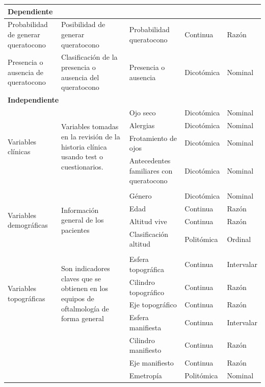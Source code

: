 \begin{landscape}
\begin{longtable}{p{4cm}p{6.5cm}p{5cm}p{3cm}p{2.5cm}}
    \multicolumn{5}{l}{\textbf{Dependiente}} \\
    \hline
    Probabilidad de generar queratocono & Posibilidad de generar queratocono & Probabilidad queratocono & Continua & Razón \\
    \hline
    Presencia o ausencia de queratocono & Clasificación de la presencia o ausencia del queratocono & Presencia o ausencia & Dicotómica & Nominal \\
    \hline
    \multicolumn{5}{l}{\textbf{Independiente}} \\
    \hline
    \multirow{4}{*}{Variables clínicas} & \multirow{4}{6.5cm}{Variables tomadas en la revisión de la historia clínica usando test o cuestionarios.} & Ojo seco & Dicotómica & Nominal \\
    \cline{3-5}
    & & Alergias & Dicotómica & Nominal \\
    \cline{3-5}
    & & Frotamiento de ojos & Dicotómica & Nominal \\
    \cline{3-5}
    & & Antecedentes familiares con queratocono & Dicotómica & Nominal \\
    \hline \\
    \multirow{4}{*}{Variables demográficas} & \multirow{4}{6.5cm}{Información general de los pacientes} & Género & Dicotómica & Nominal \\
    \cline{3-5}
    & & Edad & Continua & Razón \\
    \cline{3-5}
    & & Altitud vive & Continua & Razón \\
    \cline{3-5}
    & & Clasificación altitud & Politómica & Ordinal \\
    \hline
    \hline \\
    \multirow{4}{*}{Variables topográficas} & \multirow{4}{6.5cm}{Son indicadores claves que se obtienen en los equipos de oftalmología de forma general} & Esfera topográfica & Continua & Intervalar \\
    \cline{3-5}
    & & Cilindro topográfico & Continua & Razón \\
    \cline{3-5}
    & & Eje topográfico & Continua & Razón \\
    \cline{3-5}
    & & Esfera manifiesta & Continua & Intervalar \\
    \cline{3-5}
    & & Cilindro manifiesto & Continua & Razón \\
    \cline{3-5}
    & & Eje manifiesto & Continua & Razón \\
    \cline{3-5}
    & & Emetropía & Politómica & Nominal \\

\end{longtable}
\end{landscape}
